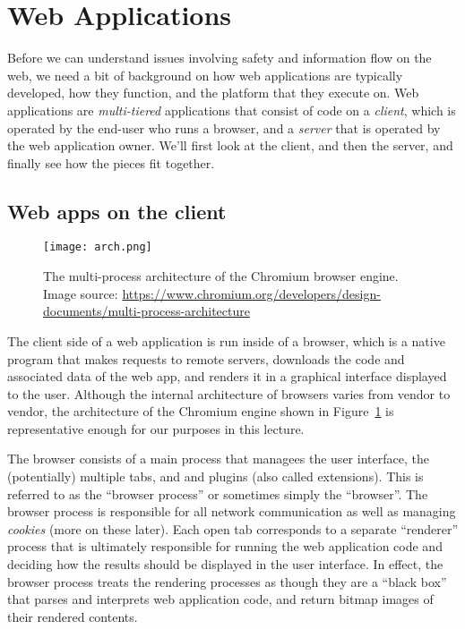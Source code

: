 \documentclass[11pt,twoside]{scrartcl}
\begin{document}
\section{Web Applications}

Before we can understand issues involving safety and information flow on the web, we need a bit of background on how web applications are typically developed, how they function, and the platform that they execute on. Web applications are \emph{multi-tiered} applications that consist of code on a \emph{client}, which is operated by the end-user who runs a browser, and a \emph{server} that is operated by the web application owner. We'll first look at the client, and then the server, and finally see how the pieces fit together.

\subsection{Web apps on the client}

\begin{figure}
\centering
\texttt{[image: arch.png]}

\caption{\label{fig:chromium} The multi-process architecture of the Chromium browser engine. Image source: \url{https://www.chromium.org/developers/design-documents/multi-process-architecture}}
\end{figure}

The client side of a web application is run inside of a browser, which is a native program that makes requests to remote servers, downloads the code and associated data of the web app, and renders it in a graphical interface displayed to the user. Although the internal architecture of browsers varies from vendor to vendor, the architecture of the Chromium engine shown in Figure~\ref{fig:chromium} is representative enough for our purposes in this lecture. 

The browser consists of a main process that managees the user interface, the (potentially) multiple tabs, and and plugins (also called extensions). This is referred to as the ``browser process'' or sometimes simply the ``browser''. The browser process is responsible for all network communication as well as managing \emph{cookies} (more on these later). Each open tab corresponds to a separate ``renderer'' process that is ultimately responsible for running the web application code and deciding how the results should be displayed in the user interface. In effect, the browser process treats the rendering processes as though they are a ``black box'' that parses and interprets web application code, and return bitmap images of their rendered contents.
\end{document}
